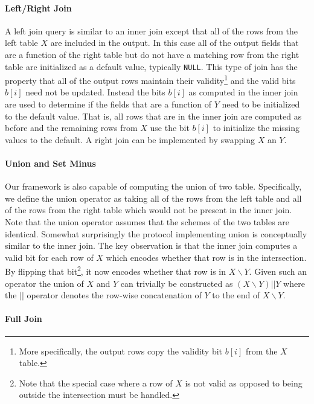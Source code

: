 \paragraph{Left/Right Join}

A left join query is similar to an inner join except that all of the rows from the left table $X$ are included in the output. In this case all of the output fields that are a function of the right table but do not have a matching row from the right table are initialized as a default value, typically \texttt{NULL}.  This type of join has the property that all of the output rows maintain their validity\footnote{More specifically, the output rows copy the validity bit $b[i]$ from the $X$ table.} and the valid bits $b[i]$ need not be updated. Instead the bits $b[i]$ as computed in the inner join are used to determine if the fields that are a function of $Y$ need to be initialized to the default value. That is, all rows that are in the inner join are computed as before and the remaining rows from $X$ use the bit $b[i]$ to initialize the missing values to the default. A right join can be implemented by swapping $X$ an $Y$.

\paragraph{Union and Set Minus}

Our framework is also capable of computing the union of two table. Specifically, we define the union operator as taking all of the rows from the left table and all of the rows from the right table which would not be present in the inner join. Note that the union operator assumes that the schemes of the two tables are identical. Somewhat surprisingly the protocol implementing union is conceptually similar to the inner join. The key observation is that the inner join computes a valid bit for each row of $X$ which encodes whether that row is in the intersection. By flipping that bit\footnote{Note that the special case where a row of $X$ is not valid as opposed to being outside the intersection must be handled.}, it now encodes whether that row is in $X\backslash Y$. Given such an operator the union of $X$ and $Y$ can trivially be constructed as $(X\backslash Y) || Y$ where the $||$ operator denotes the row-wise concatenation of $Y$ to the end of $X\backslash Y$.


\paragraph{Full Join}

